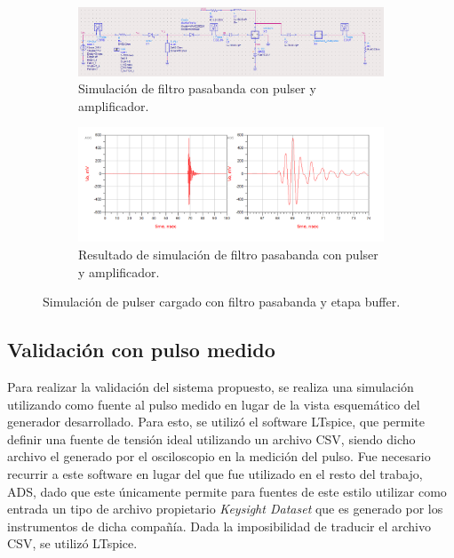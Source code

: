 \begin{figure}[t]
    \centering
    \begin{subfigure}[b]{0.45\textwidth}
        \centering
        \includegraphics[width=\linewidth]{images/passband_pulser_sim_with_amp.png}
        \caption{Simulación de filtro pasabanda con pulser y amplificador.}
        \label{fig:passband_pulser_sim_with_amp}
    \end{subfigure}
    \hfill
    \begin{subfigure}[b]{0.45\textwidth}
        \centering
        \includegraphics[width=\linewidth]{images/passband_pulser_sim_with_amp_result.png}
        \caption{Resultado de simulación de filtro pasabanda con pulser y
        amplificador.}
        \label{fig:passband_pulser_sim_with_amp_result}
    \end{subfigure}
    \caption{Simulación de pulser cargado con filtro pasabanda y etapa buffer.}
    \label{fig:passband_pulser_with_amp}
\end{figure}

\subsection{Validación con pulso medido}

Para realizar la validación del sistema propuesto, se realiza una simulación
utilizando como fuente al pulso medido en lugar de la vista esquemático del
generador desarrollado. Para esto, se utilizó el software LTspice, que permite
definir una fuente de tensión ideal utilizando un archivo CSV, siendo dicho
archivo el generado por el osciloscopio en la medición del pulso. Fue necesario
recurrir a este software en lugar del que fue utilizado en el resto del trabajo,
ADS, dado que este únicamente permite para fuentes de este estilo utilizar como
entrada un tipo de archivo propietario \textit{Keysight Dataset} que es generado
por los instrumentos de dicha compañía. Dada la imposibilidad de traducir el
archivo CSV, se utilizó LTspice.


